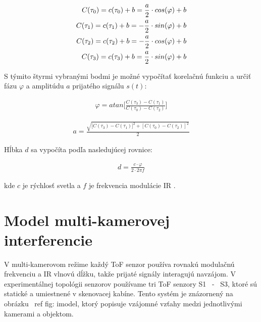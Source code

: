 \begin{equation}
\label{eq::tof::06}
\begin{aligned}
C(\tau _0) = c(\tau _0) + b}=  {{\frac{a}{2}} \cdot cos(\varphi) +b \\
C(\tau _1) = c(\tau _1) + b}= - {{\frac{a}{2}} \cdot sin(\varphi) +b \\
C(\tau _2) = c(\tau _2) + b}=- {{\frac{a}{2}} \cdot cos(\varphi) +b \\
C(\tau _3) = c(\tau _3) + b}= {{\frac{a}{2}} \cdot sin(\varphi) +b 
\end{aligned}
\end{equation}

\noindent S týmito štyrmi vybranými bodmi je možné vypočítať korelačnú funkciu a určiť fázu $\varphi$ a amplitúdu $a$ prijatého signálu $s(t)$:

\begin{equation}
\label{eq::tof::07}
\begin{aligned}
\varphi = atan \Bigg[ {\frac{C(\tau _3) - C(\tau _1)}{C(\tau _0) - C(\tau _2)}} \Bigg]
\end{aligned}
\end{equation}

\begin{equation}
\label{eq::tof::08}
\begin{aligned}
a =  \frac{\sqrt{{[C(\tau _3) - C(\tau _1)}]^2 + [{C(\tau _0) - C(\tau _2)}]^2}}{2}  
\end{aligned}
\end{equation}


\noindent Hĺbka $d$ sa vypočíta podľa nasledujúcej rovnice:


\begin{equation}
\label{eq::tof::09}
\begin{aligned}
d = \frac{ c \cdot \varphi }{ 2 \cdot 2 \pi f}
\end{aligned}
\end{equation}

\noindent kde $c$ je rýchlosť svetla a $f$ je frekvencia modulácie IR \cite {Lange}.


\section{Model multi-kamerovej interferencie}

V multi-kamerovom režime každý ToF senzor používa rovnakú modulačnú frekvenciu a IR vlnovú dĺžku, takže prijaté signály interagujú navzájom. V experimentálnej topológii senzorov používame tri ToF senzory S1 \, - \, S3, ktoré sú statické a umiestnené v skenovacej kabíne. Tento systém je znázornený na obrázku \ ref {fig: imodel}, ktorý popisuje vzájomné vzťahy medzi jednotlivými kamerami a objektom.

